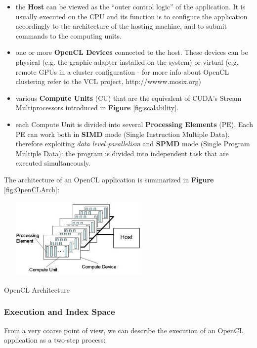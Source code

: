 \begin{itemize}
	\item the \textbf{Host} can be viewed as the "`outer control logic"' of the application. It is usually executed on the CPU and its function is to configure the application accordingly to the architecture of the hosting machine, and to submit commands to the computing units.
	\item one or more \textbf{OpenCL Devices} connected to the host. These devices can be physical (e.g. the graphic adapter installed on the system) or virtual (e.g. remote GPUs in a cluster configuration - for more info about OpenCL clustering refer to the VCL project, http://wwww.mosix.org)
	\item various \textbf{Compute Units} (CU) that are the equivalent of CUDA's Stream Multiprocessors introduced in \textbf{Figure} \ref{fig:scalability}.
	\item each Compute Unit is divided into several \textbf{Processing Elements} (PE). Each PE can work both in \textbf{SIMD} mode (Single Instruction Multiple Data), therefore exploiting \textit{data level parallelism} and \textbf{SPMD} mode (Single Program Multiple Data): the program is divided into independent task that are executed simultaneously.
\end{itemize}

The architecture of an OpenCL application is summarized in \textbf{Figure} \ref{fig:OpenCLArch}:

\begin{figurehere}
 \centering
 \includegraphics[width=8cm, height=4cm]{./eps/OpenCLArch.eps}
 \caption{OpenCL Architecture}
 \label{fig:OpenCLArch}
\end{figurehere}

\subsubsection{Execution and Index Space}

From a very coarse point of view, we can describe the execution of an OpenCL application as a two-step process:

